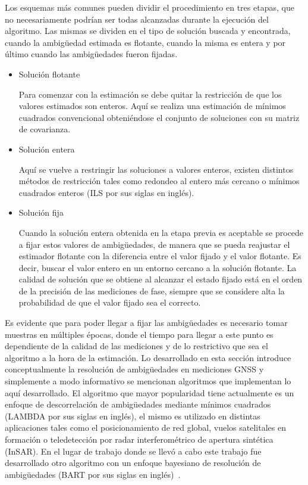 \documentclass[a4paper,12pt,oneside,onecolumn,final,openright]{book}%
\begin{document}
	Los esquemas más comunes pueden dividir el procedimiento en tres etapas, que no necesariamente podrían ser todas alcanzadas durante la ejecución del algoritmo. Las mismas se dividen en el tipo de solución buscada y encontrada, cuando la ambigüedad estimada es flotante, cuando la misma es entera y por último cuando las ambigüedades fueron fijadas.
\begin{itemize}
	\item Solución flotante
	
	Para comenzar con la estimación se debe quitar la restricción de que los valores estimados son enteros. Aquí se realiza una estimación de mínimos cuadrados convencional obteniéndose el conjunto de soluciones con su matriz de covarianza.
	\item Solución entera
	
	Aquí se vuelve a restringir las soluciones a valores enteros, existen distintos métodos de restricción tales como redondeo al entero más cercano o mínimos cuadrados enteros (ILS por sus siglas en inglés).
	\item Solución fija
	
	Cuando la solución entera obtenida en la etapa previa es aceptable se procede a fijar estos valores de ambigüedades, de manera que se pueda reajustar el estimador flotante con la diferencia entre el valor fijado y el valor flotante. Es decir, buscar el valor entero en un entorno cercano a la solución flotante. La calidad de solución que se obtiene al alcanzar el estado fijado está en el orden de la precisión de las mediciones de fase, siempre que se considere alta la probabilidad de que el valor fijado sea el correcto.
\end{itemize}
	
	Es evidente que para poder llegar a fijar las ambigüedades es necesario tomar muestras en múltiples épocas, donde el tiempo para llegar a este punto es dependiente de la calidad de las mediciones y de lo restrictivo que sea el algoritmo a la hora de la estimación. Lo desarrollado en esta sección introduce conceptualmente la resolución de ambigüedades en mediciones GNSS y simplemente a modo informativo se mencionan algoritmos que implementan lo aquí desarrollado. El algoritmo que mayor popularidad tiene actualmente es un enfoque de descorrelación de ambigüedades mediante mínimos cuadrados (LAMBDA por sus siglas en inglés), el mismo es utilizado en distintas aplicaciones tales como el posicionamiento de red global, vuelos satelitales en formación o teledetección por radar interferométrico de apertura sintética (InSAR). En el lugar de trabajo donde se llevó a cabo este trabajo fue desarrollado otro algoritmo con un enfoque  bayesiano de resolución de ambigüedades (BART por sus siglas en inglés)~\cite{bart}.
\end{document}
